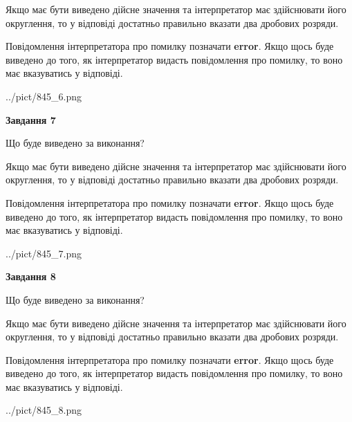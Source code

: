 \documentclass[12pt, ukrainian]{article}
\begin{document}
{\begin {Large}
Якщо має бути виведено дійсне значення та інтерпретатор має здійснювати його округлення, 
то у відповіді достатньо правильно вказати два дробових розряди.

Повідомлення інтерпретатора про помилку позначати \textbf{error}.
Якщо щось буде виведено до того, як інтерпретатор видасть повідомлення про помилку, 
то воно має вказуватись у відповіді. \par

\begin{center}
	{../pict/845_6.png}
\end{center}
\newpage

{\begin {center}\textbf{Завдання 7}\end {center}}\par
Що буде виведено за виконання? \par

Якщо має бути виведено дійсне значення та інтерпретатор має здійснювати його округлення, 
то у відповіді достатньо правильно вказати два дробових розряди.

Повідомлення інтерпретатора про помилку позначати \textbf{error}.
Якщо щось буде виведено до того, як інтерпретатор видасть повідомлення про помилку, 
то воно має вказуватись у відповіді. \par

\begin{center}
	{../pict/845_7.png}
\end{center}
\newpage

{\begin {center}\textbf{Завдання 8}\end {center}}\par
Що буде виведено за виконання? \par

Якщо має бути виведено дійсне значення та інтерпретатор має здійснювати його округлення, 
то у відповіді достатньо правильно вказати два дробових розряди.

Повідомлення інтерпретатора про помилку позначати \textbf{error}.
Якщо щось буде виведено до того, як інтерпретатор видасть повідомлення про помилку, 
то воно має вказуватись у відповіді. \par

\begin{center}
	{../pict/845_8.png}
\end{center}
\newpage


\end{Large}}
\end{document}
